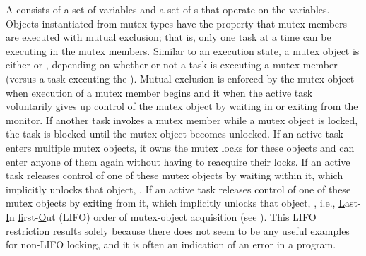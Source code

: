 \documentclass[openright,twoside]{report}
\begin{document}
A  consists of a set of variables and a set of s that operate on the variables.
Objects instantiated from mutex types have the property that mutex members are executed with mutual exclusion;
that is, only one task at a time can be executing in the mutex members.
Similar to an execution state, a mutex object is either  or , depending on whether or not a task is executing a mutex member (versus a task executing the ).
Mutual exclusion is enforced by  the mutex object when execution of a mutex member begins and  it when the active task voluntarily gives up control of the mutex object by waiting in or exiting from the monitor.
If another task invokes a mutex member while a mutex object is locked, the task is blocked until the mutex object becomes unlocked.
If an active task enters multiple mutex objects, it owns the mutex locks for these objects and can enter anyone of them again without having to reacquire their locks.
If an active task releases control of one of these mutex objects by waiting within it, which implicitly unlocks that object, .
If an active task releases control of one of these mutex objects by exiting from it, which implicitly unlocks that object, , i.e., \underline{L}ast-\underline{I}n \underline{f}irst-\underline{O}ut (LIFO) order of mutex-object acquisition (see ).
This LIFO restriction results solely because there does not seem to be any useful examples for non-LIFO locking, and it is often an indication of an error in a program.
\end{document}
